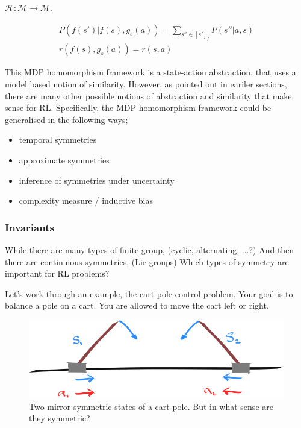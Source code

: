 \cite{Ravindran2002}

$\mathcal H: \mathcal M\to \mathcal M$.

\begin{align}
P(f(s')|f(s), g_s(a)) = \sum_{s''\in [s']_f} P(s''| a, s) \\
r(f(s), g_s(a)) = r(s, a)
\end{align}

This MDP homomorphism framework is a state-action abstraction, that uses a model based notion of similarity.
However, as pointed out in eariler sections, there are many other possible
notions of abstraction and similarity that make sense for RL. Specifically, the MDP homomorphism framework
could be generalised in the following ways;

\begin{itemize}
\tightlist
  \item temporal symmetries
  \item approximate symmetries
  \item inference of symmetries under uncertainty
  \item complexity measure / inductive bias
\end{itemize}

\subsubsection{Invariants}

While there are many types of finite group, (cyclic, alternating, ...?) And then there are continuious symmetries, (Lie groups)
Which types of symmetry are important for RL problems?

Let's work through an example, the cart-pole control problem. Your goal is to balance a pole on a cart.
You are allowed to move the cart left or right.


\begin{figure}[h!]
	\centering
	\includegraphics[width=1\textwidth,height=0.25\textheight]{../../pictures/drawings/cart-pole-mirror.png}
	\caption{Two mirror symmetric states of a cart pole. But in what sense are they symmetric?}
\end{figure}

